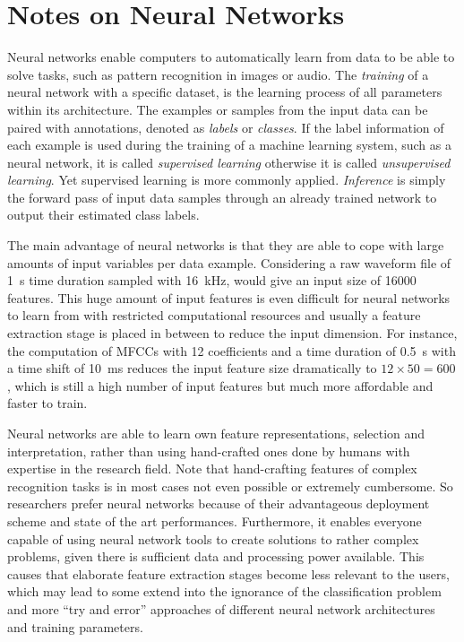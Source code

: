 
\section{Notes on Neural Networks}\label{sec:intro_nn}
Neural networks enable computers to automatically learn from data to be able to solve tasks, such as pattern recognition in images or audio.
The \emph{training} of a neural network with a specific dataset, is the learning process of all parameters within its architecture.
The examples or samples from the input data can be paired with annotations, denoted as \emph{labels} or \emph{classes}.
If the label information of each example is used during the training of a machine learning system, such as a neural network, it is called \emph{supervised learning} otherwise it is called \emph{unsupervised learning}.
Yet supervised learning is more commonly applied.
\emph{Inference} is simply the forward pass of input data samples through an already trained network to output their estimated class labels.

The main advantage of neural networks is that they are able to cope with large amounts of input variables per data example.
Considering a raw waveform file of \SI{1}{s} time duration sampled with \SI{16}{\kilo\hertz}, would give an input size of 16000 features.
This huge amount of input features is even difficult for neural networks to learn from with restricted computational resources and usually a feature extraction stage is placed in between to reduce the input dimension.
For instance, the computation of MFCCs with 12 coefficients and a time duration of \SI{0.5}{s} with a time shift of \SI{10}{\milli\second} reduces the input feature size dramatically to $12 \times 50 = 600$, which is still a high number of input features but much more affordable and faster to train.

Neural networks are able to learn own feature representations, selection and interpretation, rather than using hand-crafted ones done by humans with expertise in the research field.
Note that hand-crafting features of complex recognition tasks is in most cases not even possible or extremely cumbersome.
So researchers prefer neural networks because of their advantageous deployment scheme and state of the art performances.
Furthermore, it enables everyone capable of using neural network tools to create solutions to rather complex problems, given there is sufficient data and processing power available.
This causes that elaborate feature extraction stages become less relevant to the users, which may lead to some extend into the ignorance of the classification problem and more \enquote{try and error} approaches of different neural network architectures and training parameters.

